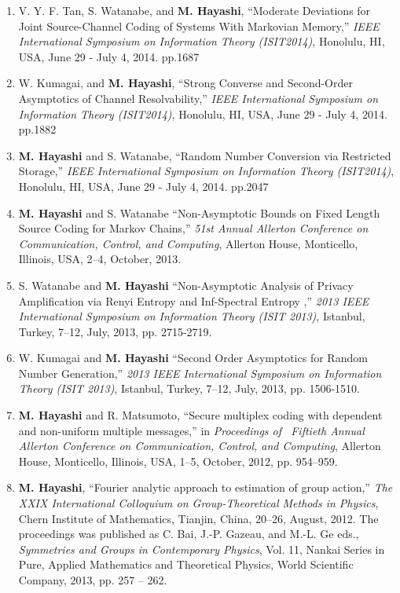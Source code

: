 \documentclass[a4paper,12pt,oneside]{article}
\begin{document}
\begin{enumerate}
\item 
V. Y. F. Tan, S. Watanabe, and \textbf{M. Hayashi}, 
``Moderate Deviations for Joint Source-Channel Coding of Systems With Markovian Memory,'' 
{\em IEEE International Symposium on Information Theory (ISIT2014)}, Honolulu, HI, USA, June 29 - July 4, 2014. pp.1687

\item 
W. Kumagai, and \textbf{M. Hayashi}, 
``Strong Converse and Second-Order Asymptotics of Channel Resolvability,''
{\em IEEE International Symposium on Information Theory (ISIT2014)}, Honolulu, HI, USA, June 29 - July 4, 2014. pp.1882

\item 
\textbf{M. Hayashi} and S. Watanabe, 
``Random Number Conversion via Restricted Storage,'' 
{\em IEEE International Symposium on Information Theory (ISIT2014)}, Honolulu, HI, USA, June 29 - July 4, 2014. pp.2047

\item 
\textbf{M. Hayashi} and S. Watanabe
``Non-Asymptotic Bounds on Fixed Length Source Coding for Markov Chains,''
{\em 51st Annual Allerton Conference on Communication, Control, and Computing}, 
Allerton House, Monticello, Illinois, USA, 2--4, October, 2013.

\item 
S. Watanabe and \textbf{M. Hayashi}
``Non-Asymptotic Analysis of Privacy Amplification via Renyi Entropy and Inf-Spectral Entropy ,'' 
{\em 2013 IEEE International Symposium on Information Theory (ISIT 2013)}, 
Istanbul, Turkey, 7--12, July, 2013, pp. 2715-2719.

\item 
W. Kumagai and \textbf{M. Hayashi}
``Second Order Asymptotics for Random Number Generation,'' 
{\em 2013 IEEE International Symposium on Information Theory (ISIT 2013)}, 
Istanbul, Turkey, 7--12, July, 2013, pp. 1506-1510.

\item  \textbf{M. Hayashi} and R. Matsumoto, 
``Secure multiplex coding with dependent and non-uniform multiple messages,''
in  \emph{Proceedings of \ Fiftieth Annual Allerton Conference on Communication, Control, and Computing}, 
Allerton House, Monticello, Illinois, USA, 1--5, October, 2012, pp. 954--959.

\item 
\textbf{M. Hayashi}, ``Fourier analytic approach to estimation of group action,'' 
{\em The XXIX International Colloquium on Group-Theoretical Methods in Physics}, 
Chern Institute of Mathematics, Tianjin, China, 20--26, August, 2012.
The proceedings was published as 
C. Bai, J.-P. Gazeau, and M.-L. Ge eds.,
{\em Symmetries and Groups in Contemporary Physics},
Vol. 11, Nankai Series in Pure, Applied Mathematics and Theoretical Physics,
World Scientific Company, 2013, pp. 257 -- 262.


\end{enumerate}
\end{document}
